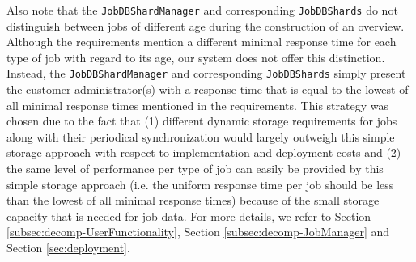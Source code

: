 \documentclass[a4paper,10pt]{article}
\begin{document}
Also note that the \texttt{JobDBShardManager} and corresponding \texttt{JobDBShards} do not distinguish between jobs of different age during the construction of an overview. Although the requirements mention a different minimal response time for each type of job with regard to its age, our system does not offer this distinction. Instead, the \texttt{JobDBShardManager} and corresponding \texttt{JobDBShards} simply present the customer administrator(s) with a response time that is equal to the lowest of all minimal response times mentioned in the requirements. This strategy was chosen due to the fact that (1) different dynamic storage requirements for jobs along with their periodical synchronization would largely outweigh this simple storage approach with respect to implementation and deployment costs and (2) the same level of performance per type of job can easily be provided by this simple storage approach (i.e. the uniform response time per job should be less than the lowest of all minimal response times) because of the small storage capacity that is needed for job data.
For more details, we refer to Section \ref{subsec:decomp-UserFunctionality}, Section \ref{subsec:decomp-JobManager} and Section \ref{sec:deployment}.
\end{document}
